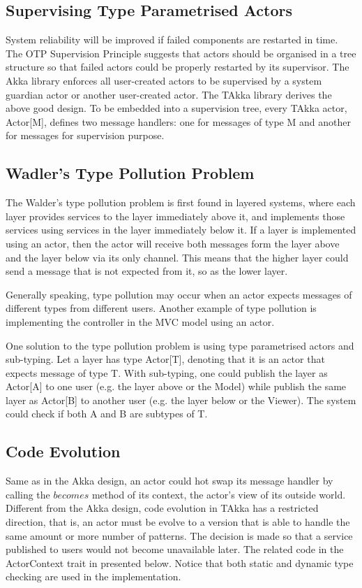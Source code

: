 \subsection{Supervising Type Parametrised Actors}
System reliability will be improved if failed components are restarted in time. The OTP Supervision Principle suggests that actors should be organised in a tree structure so that failed actors could be properly restarted by its supervisor.  The Akka library enforces all user-created actors to be supervised by a system guardian actor or another user-created actor.  The TAkka library derives the above good design.  To be embedded into a supervision tree, every TAkka actor, Actor[M], defines two message handlers: one for messages of type M and another for messages for supervision purpose.

\subsection{Wadler\rq{}s Type Pollution Problem}
The Walder\rq{}s type pollution problem is first found in layered systems, where each layer provides services to the layer immediately above it, and implements those services using services in the layer immediately below it.  If a layer is implemented using an actor, then the actor will receive both messages form the layer above and the layer below via its only channel. This means that the higher layer could send a message that is not expected from it, so as the lower layer. 

Generally speaking, type pollution may occur when an actor expects messages of different types from different users.  Another example of type pollution is implementing the controller in the MVC model using an actor.

One solution to the type pollution problem is using type parametrised actors and sub-typing.  Let a layer has type Actor[T], denoting that it is an actor that expects message of type T.  With sub-typing, one could publish the layer as Actor[A] to one user (e.g. the layer above or the Model) while publish the same layer as Actor[B] to another user (e.g. the layer below or the Viewer). The system could check if both A and B are subtypes of T.

\subsection{Code Evolution}
Same as in the Akka design, an actor could hot swap its message handler by calling the $becomes$ method of its context, the actor\rq{}s view of its outside world.  Different from the Akka design, code evolution in TAkka has a restricted direction, that is, an actor must be evolve to a version that is able to handle the same amount or more number of patterns.  The decision is made so that a service published to users would not become unavailable later.  The related code in the ActorContext trait in presented below.  Notice that both static and dynamic type checking are used in the implementation.

